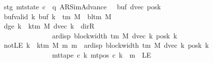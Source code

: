 \begin{isabellebody}
\ \ \ \ \ \ \ stg{}{\isacharcolon}{\kern0pt}\ {\isachardoublequoteopen}mt{\isacharunderscore}{\kern0pt}state\ c{}\ {\isacharequal}{\kern0pt}\ {\isacharparenleft}{\kern0pt}q{\isacharcomma}{\kern0pt}\ AR{\isacharunderscore}{\kern0pt}SimAdvance{\isacharcomma}{\kern0pt}\ {}{\isacharcomma}{\kern0pt}\ {}{\isacharcomma}{\kern0pt}\ buf{}{\isacharcomma}{\kern0pt}\ dvec{\isacharcomma}{\kern0pt}\ posk{}{\isacharparenright}{\kern0pt}{\isachardoublequoteclose}\isanewline
\ \ \ \ \ \ \ buf{\isacharunderscore}{\kern0pt}valid{\isacharcolon}{\kern0pt}\ {\isachardoublequoteopen}{\isasymforall}k{\isachardot}{\kern0pt}\ buf{}\ k\ {\isasymin}\ {\isasymGamma}{\isacharunderscore}{\kern0pt}tm\ M\ {\isasymunion}\ {\isacharbraceleft}{\kern0pt}bl{\isacharunderscore}{\kern0pt}tm\ M{\isacharbraceright}{\kern0pt}{\isachardoublequoteclose}\isanewline
\ \ \ \ \ \ \ dge{}{\isacharcolon}{\kern0pt}\ {\isachardoublequoteopen}{\isasymforall}k\ {\isacharless}{\kern0pt}\ k{\isacharunderscore}{\kern0pt}tm\ M{\isachardot}{\kern0pt}\ dvec\ k\ {\isasymnoteq}\ dir{\isachardot}{\kern0pt}R\isanewline
\ \ \ \ \ \ \ \ \ \ \ \ \ \ \ \ \ \ {\isasymlongrightarrow}\ {}\ {\isacharless}{\kern0pt}\ ar{\isacharunderscore}{\kern0pt}disp\ {\isacharparenleft}{\kern0pt}block{\isacharunderscore}{\kern0pt}width\ {\isacharparenleft}{\kern0pt}{\isasymGamma}{\isacharunderscore}{\kern0pt}tm\ M{\isacharparenright}{\kern0pt}{\isacharparenright}{\kern0pt}\ {\isacharparenleft}{\kern0pt}dvec\ k{\isacharparenright}{\kern0pt}\ {\isacharparenleft}{\kern0pt}posk{}\ k{\isacharparenright}{\kern0pt}{\isachardoublequoteclose}\isanewline
\ \ \ \ \ \ \ notLE{\isacharcolon}{\kern0pt}\ {\isachardoublequoteopen}{\isasymforall}k\ {\isacharless}{\kern0pt}\ k{\isacharunderscore}{\kern0pt}tm\ M{\isachardot}{\kern0pt}\ {\isasymforall}m{\isachardot}{\kern0pt}\ m\ {\isacharless}{\kern0pt}\ ar{\isacharunderscore}{\kern0pt}disp\ {\isacharparenleft}{\kern0pt}block{\isacharunderscore}{\kern0pt}width\ {\isacharparenleft}{\kern0pt}{\isasymGamma}{\isacharunderscore}{\kern0pt}tm\ M{\isacharparenright}{\kern0pt}{\isacharparenright}{\kern0pt}\ {\isacharparenleft}{\kern0pt}dvec\ k{\isacharparenright}{\kern0pt}\ {\isacharparenleft}{\kern0pt}posk{}\ k{\isacharparenright}{\kern0pt}\isanewline
\ \ \ \ \ \ \ \ \ \ \ \ \ \ \ \ \ \ \ \ {\isasymlongrightarrow}\ mt{\isacharunderscore}{\kern0pt}tape\ c{}\ k\ {\isacharparenleft}{\kern0pt}mt{\isacharunderscore}{\kern0pt}pos\ c{}\ k\ {\isacharminus}{\kern0pt}\ m{\isacharparenright}{\kern0pt}\ {\isasymnoteq}\ LE{}{\isachardoublequoteclose}\isanewline

\end{isabellebody}
